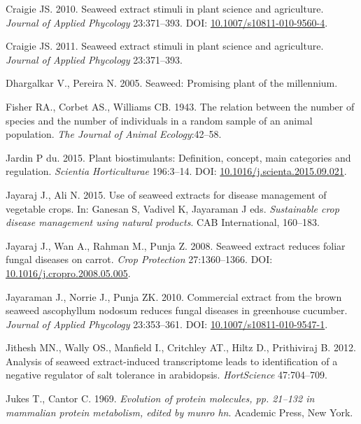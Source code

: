 \documentclass[12pt,]{article}
\begin{document}
\hypertarget{ref-Craigie2010}{}
Craigie JS. 2010. Seaweed extract stimuli in plant science and
agriculture. \emph{Journal of Applied Phycology} 23:371--393. DOI:
\href{https://doi.org/10.1007/s10811-010-9560-4}{10.1007/s10811-010-9560-4}.

\hypertarget{ref-craigie2011seaweed}{}
Craigie JS. 2011. Seaweed extract stimuli in plant science and
agriculture. \emph{Journal of Applied Phycology} 23:371--393.

\hypertarget{ref-dhargalkar2005seaweed}{}
Dhargalkar V., Pereira N. 2005. Seaweed: Promising plant of the
millennium.

\hypertarget{ref-fisher1943relation}{}
Fisher RA., Corbet AS., Williams CB. 1943. The relation between the
number of species and the number of individuals in a random sample of an
animal population. \emph{The Journal of Animal Ecology}:42--58.

\hypertarget{ref-duJardin2015}{}
Jardin P du. 2015. Plant biostimulants: Definition, concept, main
categories and regulation. \emph{Scientia Horticulturae} 196:3--14. DOI:
\href{https://doi.org/10.1016/j.scienta.2015.09.021}{10.1016/j.scienta.2015.09.021}.

\hypertarget{ref-Jayaraj2015sustainable}{}
Jayaraj J., Ali N. 2015. Use of seaweed extracts for disease management
of vegetable crops. In: Ganesan S, Vadivel K, Jayaraman J eds.
\emph{Sustainable crop disease management using natural products}. CAB
International, 160--183.

\hypertarget{ref-Jayaraj2008}{}
Jayaraj J., Wan A., Rahman M., Punja Z. 2008. Seaweed extract reduces
foliar fungal diseases on carrot. \emph{Crop Protection} 27:1360--1366.
DOI:
\href{https://doi.org/10.1016/j.cropro.2008.05.005}{10.1016/j.cropro.2008.05.005}.

\hypertarget{ref-Jayaraman2010}{}
Jayaraman J., Norrie J., Punja ZK. 2010. Commercial extract from the
brown seaweed ascophyllum nodosum reduces fungal diseases in greenhouse
cucumber. \emph{Journal of Applied Phycology} 23:353--361. DOI:
\href{https://doi.org/10.1007/s10811-010-9547-1}{10.1007/s10811-010-9547-1}.

\hypertarget{ref-jithesh2012analysis}{}
Jithesh MN., Wally OS., Manfield I., Critchley AT., Hiltz D.,
Prithiviraj B. 2012. Analysis of seaweed extract-induced transcriptome
leads to identification of a negative regulator of salt tolerance in
arabidopsis. \emph{HortScience} 47:704--709.

\hypertarget{ref-jukes1969evolution}{}
Jukes T., Cantor C. 1969. \emph{Evolution of protein molecules, pp.
21--132 in mammalian protein metabolism, edited by munro hn}. Academic
Press, New York.
\end{document}
